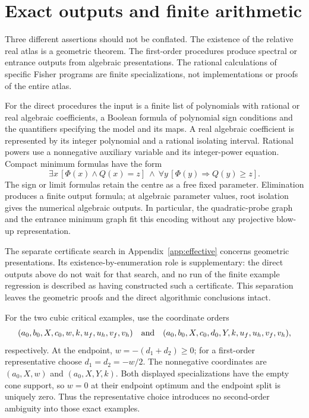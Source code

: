 \section{Exact outputs and finite arithmetic}\label{app:output-separation}
Three different assertions should not be conflated. The existence of the
relative real atlas is a geometric theorem. The first-order procedures
produce spectral or entrance outputs from algebraic presentations.
The rational calculations of specific Fisher programs are finite
specializations, not implementations or proofs of the entire atlas.

For the direct procedures the input is a finite list of polynomials with
rational or real algebraic coefficients, a Boolean formula of polynomial
sign conditions and the quantifiers specifying the model and its maps.
A real algebraic coefficient is represented by its integer polynomial
and a rational isolating interval. Rational powers use a nonnegative
auxiliary variable and its integer-power equation. Compact minimum
formulas have the form
\[
 \exists x\,[\Phi(x)\wedge Q(x)=z]
 \ \wedge\ \forall y\,[\Phi(y)\Rightarrow Q(y)\ge z].
\]
The sign or limit formulas retain the centre as a free fixed parameter.
Elimination produces a finite output formula; at algebraic parameter
values, root isolation gives the numerical algebraic outputs. In
particular, the quadratic-probe graph and the entrance minimum graph fit
this encoding without any projective blow-up representation.

The separate certificate search in Appendix~\ref{app:effective} concerns
geometric presentations. Its existence-by-enumeration role is
supplementary: the direct outputs above do not wait for that search,
and no run of the finite example regression is described as having
constructed such a certificate. This separation leaves the geometric
proofs and the direct algorithmic conclusions intact.

For the two cubic critical examples, use the coordinate orders
\[
 (a_0,b_0,X,c_0,w,k,u_f,u_h,v_f,v_h)
 \quad\hbox{and}\quad
 (a_0,b_0,X,c_0,d_0,Y,k,u_f,u_h,v_f,v_h),
\]
respectively. At the endpoint, $w=-(d_1+d_2)\ge0$; for a first-order
representative choose $d_1=d_2=-w/2$. The nonnegative coordinates are
$(a_0,X,w)$ and $(a_0,X,Y,k)$. Both displayed specializations have the
empty cone support, so $w=0$ at their endpoint optimum and the endpoint
split is uniquely zero. Thus the representative choice introduces no
second-order ambiguity into those exact examples.

